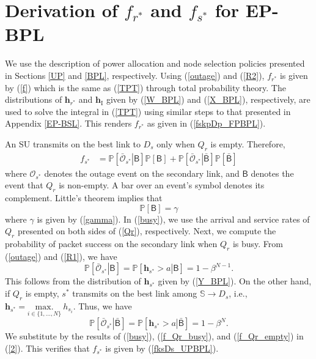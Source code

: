 \documentclass[journal,twocolumn]{IEEEtran}
\begin{document}
\section{Derivation of $f_{r^*}$ and $f_{s^*}$ for EP-BPL} \label{EP-BPL}
We use the description of power allocation and node selection policies presented in Sections \ref{UP} and \ref{BPL}, respectively. Using (\ref{outage}) and (\ref{R2}), $f_{r^*}$ is given by (\ref{f}) which is the same as (\ref{TPT}) through total probability theory. 
The distributions of $\mathbf{h}_{r^*}$ and $\mathbf{h}_{\mathrm{I}}$ given by (\ref{W_BPL}) and (\ref{X_BPL}), respectively, are used to solve the integral in (\ref{TPT}) using similar steps to that presented in Appendix \ref{EP-BSL}. This renders $f_{r^*}$ as given in (\ref{fskpDp_FPBPL}).

An SU transmits on the best link to $D_{s}$ only when $Q_{r}$ is empty. Therefore,
\begin{align}\label{2}
f_{s^*}&=\mathbb{P}\left[\left. \bar{\mathcal{O}}_{s^*} \right|\mathsf{B}\right]
\mathbb{P}\left[\mathsf{B}\right]
+\mathbb{P}\left[\left. \bar{\mathcal{O}}_{s^*} \right|\bar{\mathsf{B}}\right]
\mathbb{P}\left[\bar{\mathsf{B}}\right]
\end{align}
where $\mathcal{O}_{s^*}$ denotes the outage event on the secondary link, and $\mathsf{B}$ denotes the event that $Q_{r}$ is non-empty. A bar over an event's symbol denotes its complement. Little's theorem \cite{Bertsekas} implies that
\begin{equation}\label{busy}
\mathbb{P}\left[\mathsf{B}\right]=\gamma
\end{equation}
where $\gamma$ is given by (\ref{gamma}). In (\ref{busy}), we use the arrival and service rates of $Q_{r}$ presented on both sides of
(\ref{Qr}), respectively. Next, we compute the probability of packet success on the secondary link when $Q_{r}$ is busy. From (\ref{outage}) and (\ref{R1}), we have
\begin{equation}\label{f_Qr_busy}
\mathbb{P}\left[\left. \bar{\mathcal{O}}_{s^*} \right| \mathsf{B}\right]=
\mathbb{P}\left[\left. \mathbf{h}_{s^*} > a \right| \mathsf{B}\right]=1-\beta^{N-1}.
\end{equation}
This follows from the distribution of $\mathbf{h}_{s^*}$ given by (\ref{Y_BPL}). On the other hand, if $Q_{r}$ is empty, $s^*$ transmits on the best link among $\mathbb{S} \rightarrow D_s$,
i.e., $\mathbf{h}_{s^*} = \underset{i \in \{1,\hdots,N\}}{\mathrm{max.}}~h_{s_{i}}$. Thus, we have
\begin{equation}\label{f_Qr_empty}
\mathbb{P}\left[\left. \bar{\mathcal{O}}_{s^*}\right|\bar{\mathsf{B}}\right]=
\mathbb{P}\left[\left. \mathbf{h}_{s^*} > a \right| \bar{\mathsf{B}}\right]=1-\beta^N.
\end{equation}
We substitute by the results of (\ref{busy}), (\ref{f_Qr_busy}), and (\ref{f_Qr_empty}) in (\ref{2}). This verifies that $f_{s^*}$ is given by (\ref{fksDs_UPBPL}). 
\end{document}
